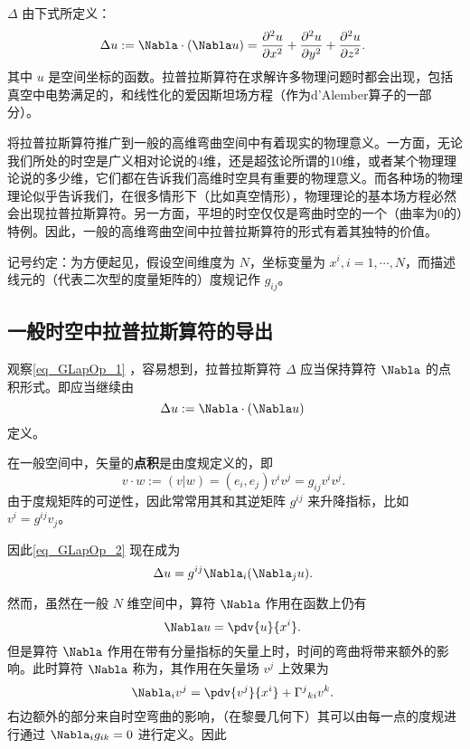 
 $\Delta$ 由下式所定义：
\begin{equation}\label{eq_GLapOp_1}
\Delta u:=\Nabla\cdot (\Nabla u)=\frac{\partial^{2}{u}}{\partial{x}^{2}} + \frac{\partial^{2}{u}}{\partial{y}^{2}} + \frac{\partial^{2}{u}}{\partial{z}^{2}}.~
\end{equation}
其中 $u$ 是空间坐标的函数。拉普拉斯算符在求解许多物理问题时都会出现，包括真空中电势满足的，和线性化的爱因斯坦场方程（作为d'Alember算子的一部分）。

将拉普拉斯算符推广到一般的高维弯曲空间中有着现实的物理意义。一方面，无论我们所处的时空是广义相对论说的4维，还是超弦论所谓的10维，或者某个物理理论说的多少维，它们都在告诉我们高维时空具有重要的物理意义。而各种场的物理理论似乎告诉我们，在很多情形下（比如真空情形），物理理论的基本场方程必然会出现拉普拉斯算符。另一方面，平坦的时空仅仅是弯曲时空的一个（曲率为0的）特例。因此，一般的高维弯曲空间中拉普拉斯算符的形式有着其独特的价值。

记号约定：为方便起见，假设空间维度为 $N$，坐标变量为 $x^i,i=1,\cdots,N$，而描述线元的（代表二次型的度量矩阵的）度规记作 $g_{ij}$。

\subsection{一般时空中拉普拉斯算符的导出}
观察\autoref{eq_GLapOp_1} ，容易想到，拉普拉斯算符 $\Delta$ 应当保持算符 $\Nabla$ 的点积形式。即应当继续由
\begin{equation}\label{eq_GLapOp_2}
\Delta u:=\Nabla\cdot (\Nabla u)~
\end{equation}
定义。

在一般空间中，矢量的\textbf{点积}是由度规定义的，即
\begin{equation}
v\cdot w:=(v|w)=(e_i,e_j)v^iv^j=g_{ij}v^iv^j.~
\end{equation}
由于度规矩阵的可逆性，因此常常用其和其逆矩阵 $g^{ij}$ 来升降指标，比如 $v^i=g^{ij}v_j$。

因此\autoref{eq_GLapOp_2} 现在成为
\begin{equation}\label{eq_GLapOp_3}
\Delta u=g^{ij}\Nabla_i(\Nabla_j u).~
\end{equation}

然而，虽然在一般 $N$ 维空间中，算符 $\Nabla$ 作用在函数上仍有
\begin{equation}
\Nabla u=\pdv{u}{x^i}.~
\end{equation}
但是算符 $\Nabla$ 作用在带有分量指标的矢量上时，时间的弯曲将带来额外的影响。此时算符 $\Nabla$ 称为，其作用在矢量场 $v^j$ 上效果为
\begin{equation}\label{eq_GLapOp_5}
\Nabla_i v^j= \pdv{v^j}{x^i}+{\Gamma^{j}}_{ki}v^k.~
\end{equation}
右边额外的部分来自时空弯曲的影响，（在黎曼几何下）其可以由每一点的度规进行通过 $\Nabla_i g_{ik}=0$ 进行定义。因此

